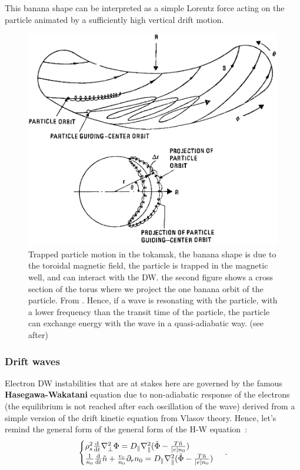 \documentclass[11pt,a4paper,openany]{report}
\begin{document}
\begin{multicols}{2}
    This banana shape can be interpreted as a simple Lorentz force acting on the particle animated by a sufficiently high vertical drift motion.
    \begin{figure}[H]
        \centering
        \includegraphics[width=1\linewidth]{./figures/banana.png}
        \caption{Trapped particle motion in the tokamak, the banana shape is due to the toroidal magnetic field, the particle is trapped in the magnetic well, and can interact with the DW. the second figure shows a cross section of the torus where we project the one banana orbit of the particle. From \cite{book_banana,Banana_distr_runaway}. Hence, if a wave is resonating with the particle, with a lower frequency than the transit time of the particle, the particle can exchange energy with the wave in a quasi-adiabatic way. (see after)}
        \label{}
    \end{figure}

    \subsubsection{Drift waves}
    Electron  DW instabilities that are at stakes here are governed by the famous \textbf{Hasegawa-Wakatani} \cite{Hasegawa,Wakatani} equation due to non-adiabatic response of the electrons (the equilibrium is not reached after each oscillation of the wave) derived from a simple version of the drift kinetic equation from Vlasov theory. Hence, let's remind the general form of the general form of the H-W equation~:
    \begin{equation}
        \begin{cases}
            \rho_s^2
            \dv{t}\nabla_\perp^2 \Phi= D_\parallel\nabla_\parallel^2(\tilde{\Phi} - \frac{T\tilde{n}}{|e|n_0}) \\
            \frac{1}{n_0}\dv{t}\tilde{n} + \frac{v_r}{n_0}\partial_r n_0 = D_\parallel\nabla_\parallel^2(\tilde{\Phi} - \frac{T\tilde{n}}{|e|n_0})
        \end{cases}\,.
    \end{equation}


\end{multicols}
\end{document}
